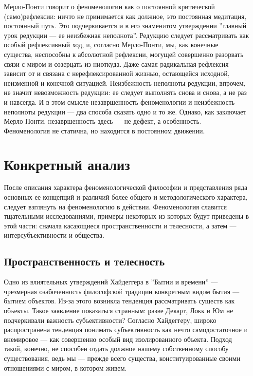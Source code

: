 \documentclass[11pt]{book}
\begin{document}
Мерло-Понти говорит о феноменологии как о постоянной критической (само)рефлексии: ничто не принимается как должное, это постоянная медитация, постоянный путь. Это подчеркивается и в его знаменитом утверждении ''главный урок редукции --- ее неизбежная неполнота''. Редукцию следует рассматривать как особый рефлексивный ход, и, согласно Мерло-Понти, мы, как конечные существа, неспособны к абсолютной рефлексии, могущей совершенно разорвать связи с миром и созерцать из ниоткуда. Даже самая радикальная рефлексия зависит от и связана с нерефлексированной жизнью, остающейся исходной, неизменной и конечной ситуацией. Неизбежность неполноты редукции, впрочем, не значит невозможность редукции: ее следует выполнять снова и снова, а не раз и навсегда. И в этом смысле незавршенность феноменологии и неизбежность неполноты редукции --- два способа сказать одно и то же. Однако, как заключает Мерло-Понти, незавршенность здесь --- не дефект, а особенность. Феноменология не статична, но находится в постоянном движении.

\part{Конкретный анализ}

После описания характера феноменологической философии и представления ряда основных ее концепций и различий более общего и методологического характера, следует взглянуть на феноменологию в действии. Феноменология славится тщательными исследованиями, примеры некоторых из которых будут приведены в этой части: сначала касающиеся пространственности и телесности, а затем --- интерсубъективности и общества.

\chapter{Пространственность и телесность}

Одно из влиятельных утверждений Хайдеггера в ''Бытии и времени'' --- чрезмерная озабоченность философской традиции конкретным видом бытия --- бытием объектов. Из-за этого возникла тенденция рассматривать существ как объекты. Такое заявление показаться странным: разве Декарт, Локк и Юм не подчеркивали важность субъективности? Согласно Хайдеггеру, широко распространена тенденция понимать субъективность как нечто самодостаточное и внемировое --- как совершенно особый вид изолированного объекта. Подход такой, конечно, не способен отдать должное нашему собственному способу существования, ведь мы --- прежде всего существа, конституированные своими отношениями с миром, в котором живем.
\end{document}
